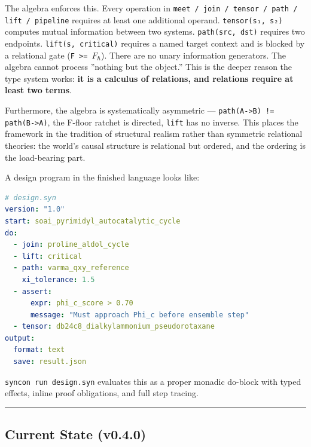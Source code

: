 \documentclass[12pt,a4paper]{article}
\begin{document}
The algebra enforces this. Every operation in \texttt{meet / join / tensor / path / lift / pipeline} requires at least one additional operand. \texttt{tensor(s₁, s₂)} computes mutual information between two systems. \texttt{path(src, dst)} requires two endpoints. \texttt{lift(s, critical)} requires a named target context and is blocked by a relational gate (\texttt{F \textgreater{}= $F_{\hbar}$}). There are no unary information generators. The algebra cannot process ''nothing but the object.'' This is the deeper reason the type system works: \textbf{it is a calculus of relations, and relations require at least two terms}.

Furthermore, the algebra is systematically asymmetric --- \texttt{path(A-\textgreater{}B) != path(B-\textgreater{}A)}, the F-floor ratchet is directed, \texttt{lift} has no inverse. This places the framework in the tradition of structural realism rather than symmetric relational theories: the world's causal structure is relational but ordered, and the ordering is the load-bearing part.

A design program in the finished language looks like:

\begin{lstlisting}[language=YAML]
# design.syn
version: "1.0"
start: soai_pyrimidyl_autocatalytic_cycle
do:
  - join: proline_aldol_cycle
  - lift: critical
  - path: varma_qxy_reference
    xi_tolerance: 1.5
  - assert:
      expr: phi_c_score > 0.70
      message: "Must approach Phi_c before ensemble step"
  - tensor: db24c8_dialkylammonium_pseudorotaxane
output:
  format: text
  save: result.json
\end{lstlisting}

\texttt{syncon run design.syn} evaluates this as a proper monadic do-block with typed effects, inline proof obligations, and full step tracing.

\begin{center}
\rule{0.5\textwidth}{0.4pt}
\end{center}

\subsection{Current State (v0.4.0)}
\end{document}
